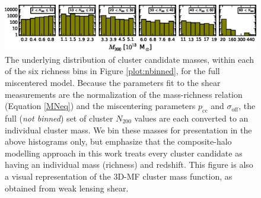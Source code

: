 \begin{figure}
\begin{center}
  \includegraphics[scale=1.0]{plots_ch4/m200panels_NoGaps.eps}
  \caption[Cluster Mass Distributions for each Richness Bin]{The underlying distribution of cluster candidate masses, within each of the six richness bins in Figure \ref{plot:nbinned}, for the full miscentered model. Because the parameters fit to the shear measurements are the normalization of the mass-richness relation (Equation \ref{MNeq}) and the miscentering parameters $p_{\mathrm{cc}}$ and $\sigma_{\mathrm{off}}$, the full ({\it not binned}) set of cluster $N_{200}$ values are each converted to an individual cluster mass. We bin these masses for presentation in the above histograms only, but emphasize that the composite-halo modelling approach in this work treats every cluster candidate as having an individual mass (richness) and redshift. This figure is also a visual representation of the \ac{3D-MF} cluster mass function, as obtained from weak lensing shear.}
\label{plot:multimass}
\end{center}
\end{figure}


